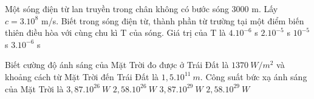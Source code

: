 \begin{vidu} %
 Một sóng điện từ lan truyền trong chân không có bước sóng 3000 m. Lấy $c=3.10^8$ m/s. Biết trong sóng điện từ, thành phần từ trường tại một điểm biến thiên điều hòa với cùng chu kì T của sóng. Giá trị của T là
\choice
{$4.10^{-6}$ s}
{$2.10^{-5}$ s}
{\True $10^{-5}$ s}
{$3.10^{-6}$ s}
\end{vidu} 
\begin{vidu}%
	Biết cường độ ánh sáng của Mặt Trời đo được ở Trái Đất là $1370\ W/m^2$ và khoảng cách từ Mặt Trời đến Trái Đất là $1,5.10^{11}\ m$. Công suất bức xạ ánh sáng của Mặt Trời là
	\choice
	{\True $3,87.10^{26}\ W$}
	{$2,58.10^{26}\ W$}
	{$3,87.10^{29}\ W$}
	{$2,58.10^{29}\ W$}
\end{vidu} %
